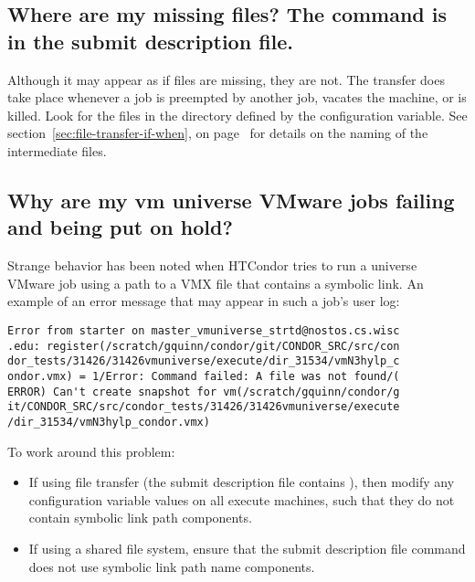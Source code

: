 \subsection*{Where are my missing files?  The command  is in the submit description file.}
Although it may appear as if files are missing,
they are not.
The transfer does take place whenever a job is 
preempted by another job, vacates the machine, or is killed.
Look for the files in the directory defined by
the  configuration variable.
See
section~\ref{sec:file-transfer-if-when}, on
page~\pageref{sec:file-transfer-if-when} for details on the naming
of the intermediate files.

\subsection*{\label{sec:vmware-symlink-bug}Why are my vm universe VMware jobs failing and being put on hold?}

Strange behavior has been noted when HTCondor tries to run a 
 universe VMware
job using a path to a VMX file that contains a symbolic link.
An example of an error message that may appear in such a job's user log:
\begin{verbatim}
Error from starter on master_vmuniverse_strtd@nostos.cs.wisc
.edu: register(/scratch/gquinn/condor/git/CONDOR_SRC/src/con
dor_tests/31426/31426vmuniverse/execute/dir_31534/vmN3hylp_c
ondor.vmx) = 1/Error: Command failed: A file was not found/(
ERROR) Can't create snapshot for vm(/scratch/gquinn/condor/g
it/CONDOR_SRC/src/condor_tests/31426/31426vmuniverse/execute
/dir_31534/vmN3hylp_condor.vmx)
\end{verbatim}
To work around this problem:
\begin{itemize}
\item If using file transfer
(the submit description file contains
),
then modify any
configuration variable  values on all execute machines,
such that they do not contain symbolic link path components.
\item If using a shared file system, ensure that the
submit description file command
 does not use
symbolic link path name components.
\end{itemize}

